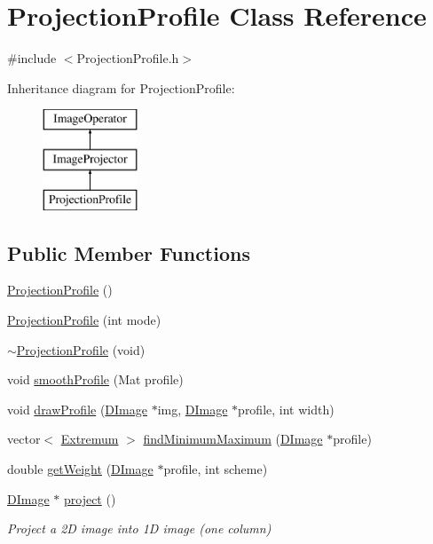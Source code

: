 \hypertarget{class_projection_profile}{\section{Projection\+Profile Class Reference}
\label{class_projection_profile}
}


{\ttfamily \#include $<$Projection\+Profile.\+h$>$}

Inheritance diagram for Projection\+Profile\+:\begin{figure}[H]
\begin{center}
\leavevmode
\includegraphics[height=3.000000cm]{class_projection_profile}
\end{center}
\end{figure}
\subsection*{Public Member Functions}
\begin{DoxyCompactItemize}
\item 
\hyperlink{class_projection_profile_a731890565b59cf377deb0c09638216c9}{Projection\+Profile} ()
\item 
\hyperlink{class_projection_profile_aefd5810dbfc34bddd1c7fedb539d6996}{Projection\+Profile} (int mode)
\item 
\hyperlink{class_projection_profile_ab901ba9a5572288f36e23f926ec85028}{$\sim$\+Projection\+Profile} (void)
\item 
void \hyperlink{class_projection_profile_a2f196aaeff36268a12033b0d35180c4d}{smooth\+Profile} (Mat profile)
\item 
void \hyperlink{class_projection_profile_a8bb3b2db0312483fc39ea60cb0067612}{draw\+Profile} (\hyperlink{class_d_image}{D\+Image} $\ast$img, \hyperlink{class_d_image}{D\+Image} $\ast$profile, int width)
\item 
vector$<$ \hyperlink{_projection_profile_8h_a9d6aea485bdd024cbf1618a864c0dc50}{Extremum} $>$ \hyperlink{class_projection_profile_ad3ee9dbf2b9a932fc5e2e591b1d9e693}{find\+Minimum\+Maximum} (\hyperlink{class_d_image}{D\+Image} $\ast$profile)
\item 
double \hyperlink{class_projection_profile_a558047469b18ba1fa1ae3ffd98e3c491}{get\+Weight} (\hyperlink{class_d_image}{D\+Image} $\ast$profile, int scheme)
\item 
\hyperlink{class_d_image}{D\+Image} $\ast$ \hyperlink{class_projection_profile_a876b05a649f497584fe5d5632ffab9c0}{project} ()
\begin{DoxyCompactList}\small\item\em Project a 2\+D image into 1\+D image (one column) \end{DoxyCompactList}\end{DoxyCompactItemize}

